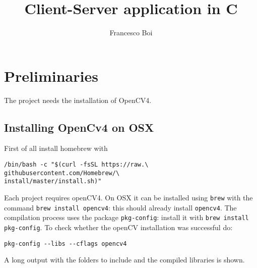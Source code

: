 \documentclass[12pt, letterpaper]{article}
\theoremstyle{definition}
\begin{document}
\title{Client-Server application in C}
\author{Francesco Boi}
\date{\vspace{-5ex}}
\maketitle
{}
\tableofcontents

\section{Preliminaries}
The project needs the installation of OpenCV4.

\subsection{Installing OpenCv4 on OSX}
First of all install homebrew with 
\begin{lstlisting}
/bin/bash -c "$(curl -fsSL https://raw.\
githubusercontent.com/Homebrew/\
install/master/install.sh)"
\end{lstlisting}

Each project requires openCV4. On OSX it can be installed using \lstinline+brew+ with the command \lstinline+brew install opencv4+: this should already install \lstinline+opencv4+. The compilation process uses the package \lstinline+pkg-config+: install it with \lstinline+brew install pkg-config+. To check whether the openCV installation was successful do: 
\begin{lstlisting}
pkg-config --libs --cflags opencv4
\end{lstlisting}
A long output with the folders to include and the compiled libraries is shown.
\end{document}
